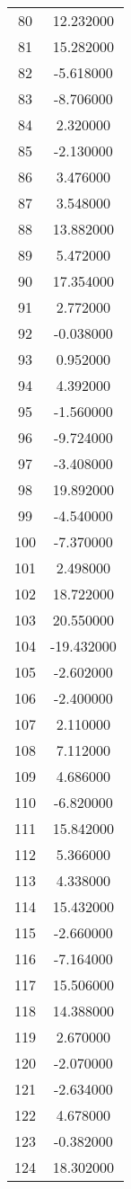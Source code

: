 \documentclass[12pt]{article}
\begin{document}
\begin{longtable}{@{}cc@{}}
80 & 12.232000 \\
81 & 15.282000 \\
82 & -5.618000 \\
83 & -8.706000 \\
84 & 2.320000 \\
85 & -2.130000 \\
86 & 3.476000 \\
87 & 3.548000 \\
88 & 13.882000 \\
89 & 5.472000 \\
90 & 17.354000 \\
91 & 2.772000 \\
92 & -0.038000 \\
93 & 0.952000 \\
94 & 4.392000 \\
95 & -1.560000 \\
96 & -9.724000 \\
97 & -3.408000 \\
98 & 19.892000 \\
99 & -4.540000 \\
100 & -7.370000 \\
101 & 2.498000 \\
102 & 18.722000 \\
103 & 20.550000 \\
104 & -19.432000 \\
105 & -2.602000 \\
106 & -2.400000 \\
107 & 2.110000 \\
108 & 7.112000 \\
109 & 4.686000 \\
110 & -6.820000 \\
111 & 15.842000 \\
112 & 5.366000 \\
113 & 4.338000 \\
114 & 15.432000 \\
115 & -2.660000 \\
116 & -7.164000 \\
117 & 15.506000 \\
118 & 14.388000 \\
119 & 2.670000 \\
120 & -2.070000 \\
121 & -2.634000 \\
122 & 4.678000 \\
123 & -0.382000 \\
124 & 18.302000 \\

\end{longtable}
\end{document}

